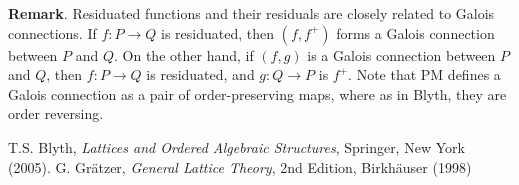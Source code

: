 \documentclass[12pt]{article}
\begin{document}
\textbf{Remark}.  Residuated functions and their residuals are closely related to Galois connections.  If $f:P\to Q$ is residuated, then $(f,f^+)$ forms a Galois connection between $P$ and $Q$.  On the other hand, if $(f,g)$ is a Galois connection between $P$ and $Q$, then $f: P\to Q$ is residuated, and $g: Q\to P$ is $f^+$.  Note that PM defines a Galois connection as a pair of order-preserving maps, where as in Blyth, they are order reversing.

\begin{thebibliography}{6}
 T.S. Blyth, {\em Lattices and Ordered Algebraic Structures}, Springer, New York (2005).
 G. Gr\"atzer, {\it General Lattice Theory}, 2nd Edition, Birkh\"auser (1998)
\end{thebibliography}
\end{document}
